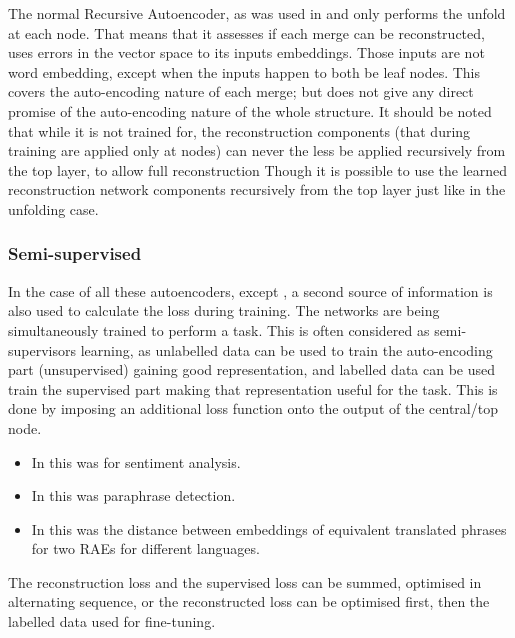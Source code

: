 \documentclass[12pt,parskip]{komatufte}
\begin{document}
The normal Recursive Autoencoder,
as was used in \textcite{SocherEtAl2011:RAE} and \textcite{zhang2014BRAE} only performs the unfold at each node.
That means that it assesses if each merge can be reconstructed, uses errors in the vector space to its inputs embeddings.
Those inputs are not word embedding, except when the inputs happen to both be leaf nodes.
This covers the auto-encoding nature of each merge;
but does not give any direct promise of the auto-encoding nature of the whole structure.
It should be noted that while it is not trained for, the reconstruction components (that during training are applied only at nodes) can never the less be applied recursively from the top layer, to allow full reconstruction
Though it is possible to use the learned reconstruction network components recursively from the top layer just like in the unfolding case.

\subsubsection{Semi-supervised}
In the case of all these autoencoders, except \textcite{iyyer2014generating}, a second source of information is also used to calculate the loss during training.
The networks are being simultaneously trained to perform a task.
This is often considered as semi-supervisors learning, as unlabelled data can be used to train the auto-encoding part (unsupervised) gaining good representation, and labelled data can be used train the supervised part making that representation useful for the task.
This is done by imposing an additional loss function onto the output of the central/top node.
\begin{itemize}
 \item In \textcite{SocherEtAl2011:RAE} this was for sentiment analysis.
 \item In \textcite{SocherEtAl2011:PoolRAE} this was paraphrase detection.
 \item In \textcite{zhang2014BRAE} this was the distance between embeddings of equivalent translated phrases for two RAEs for different languages.
\end{itemize}
The reconstruction loss and the supervised loss can be summed, optimised in alternating sequence, or the reconstructed loss can be optimised first, then the labelled data used for fine-tuning.

 
\end{document}
